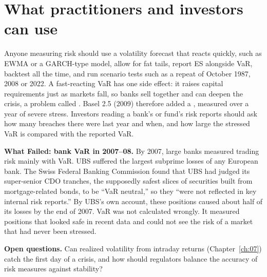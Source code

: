 \section{What practitioners and investors can use}
\label{sec:11-investors}

Anyone measuring risk should use a volatility forecast that reacts quickly, such as EWMA or a GARCH-type model, allow for fat tails, report ES alongside VaR, backtest all the time, and run scenario tests such as a repeat of October 1987, 2008 or 2022. A fast-reacting VaR has one side effect: it raises capital requirements just as markets fall, so banks sell together and can deepen the crisis, a problem called . Basel 2.5 (2009) therefore added a , measured over a year of severe stress. Investors reading a bank's or fund's risk reports should ask how many breaches there were last year and when, and how large the stressed VaR is compared with the reported VaR.

\textbf{What Failed: bank VaR in 2007--08.} By 2007, large banks measured trading risk mainly with VaR. UBS suffered the largest subprime losses of any European bank. The Swiss Federal Banking Commission found that UBS had judged its super-senior CDO tranches, the supposedly safest slices of securities built from mortgage-related bonds, to be ``VaR neutral,'' so they ``were not reflected in key internal risk reports.'' By UBS's own account, these positions caused about half of its losses by the end of 2007. VaR was not calculated wrongly. It measured positions that looked safe in recent data and could not see the risk of a market that had never been stressed.

\label{sec:11-open}
\textbf{Open questions.} Can realized volatility from intraday returns (Chapter~\ref{ch:07}) catch the first day of a crisis, and how should regulators balance the accuracy of risk measures against stability?

\makeatletter
{}
\makeatother

